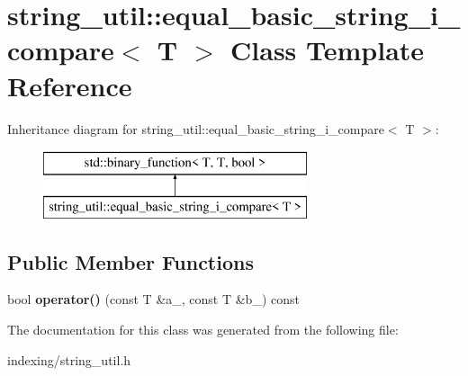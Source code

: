 \hypertarget{classstring__util_1_1equal__basic__string__i__compare}{\section{string\-\_\-util\-:\-:equal\-\_\-basic\-\_\-string\-\_\-i\-\_\-compare$<$ T $>$ Class Template Reference}
\label{classstring__util_1_1equal__basic__string__i__compare}
}
Inheritance diagram for string\-\_\-util\-:\-:equal\-\_\-basic\-\_\-string\-\_\-i\-\_\-compare$<$ T $>$\-:\begin{figure}[H]
\begin{center}
\leavevmode
\includegraphics[height=2.000000cm]{classstring__util_1_1equal__basic__string__i__compare}
\end{center}
\end{figure}
\subsection*{Public Member Functions}
\begin{DoxyCompactItemize}
\item 
\hypertarget{classstring__util_1_1equal__basic__string__i__compare_a29fabe519d28908f5b72dcb799cac64f}{bool {\bfseries operator()} (const T \&a\-\_\-, const T \&b\-\_\-) const }\label{classstring__util_1_1equal__basic__string__i__compare_a29fabe519d28908f5b72dcb799cac64f}

\end{DoxyCompactItemize}


The documentation for this class was generated from the following file\-:\begin{DoxyCompactItemize}
\item 
indexing/string\-\_\-util.\-h\end{DoxyCompactItemize}
